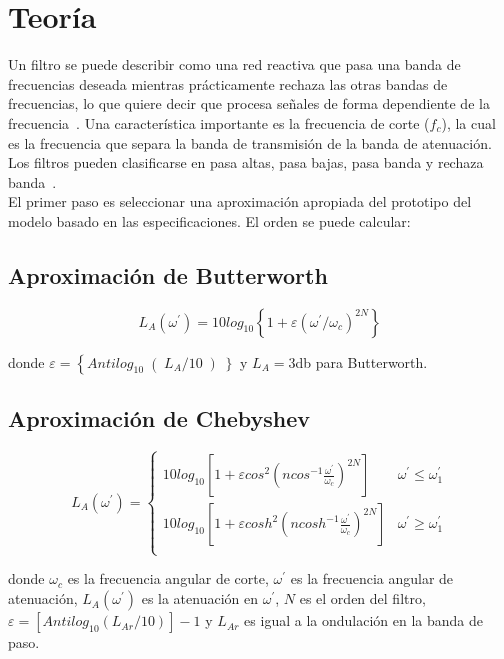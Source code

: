 \section{Teoría}
Un filtro se puede describir como una red reactiva que pasa una banda de frecuencias deseada mientras prácticamente rechaza las otras bandas de frecuencias, lo que quiere decir que procesa señales de forma dependiente de la frecuencia~\cite{zumbahlen2008581}. Una característica importante es la frecuencia de corte ($f_{c}$), la cual es la frecuencia que separa la banda de transmisión de la banda de atenuación. Los filtros pueden clasificarse en pasa altas, pasa bajas, pasa banda y rechaza banda~\cite{keysight_csc2}. \\

El primer paso es seleccionar una aproximación apropiada del prototipo del modelo basado en las especificaciones. El orden se puede calcular:

\subsection*{Aproximación de Butterworth}
\begin{equation}
    L_{A}(\omega^{'}) = 10 log_{10} \left\{1 + \varepsilon \left( \omega^{'} / \omega_{c} \right)^{2N} \right\}
\end{equation}

donde $\varepsilon = \left\{ Antilog_{10} \right( L_{A} / 10 \left) \right\}$ y $L_{A} = 3$db para Butterworth.


\subsection*{Aproximación de Chebyshev}
\begin{equation}
    L_{A}(\omega^{'}) =
    \begin{cases}
        10 log_{10} \left[ 1 + \varepsilon cos^{2} \left( ncos^{-1} \frac{\omega^{'}}{\omega_{c}} \right)^{2N} \right] & \omega^{'} \leq \omega^{'}_{1} \\
        10 log_{10} \left[ 1 + \varepsilon cosh^{2} \left( ncosh^{-1} \frac{\omega^{'}}{\omega_{c}} \right)^{2N} \right] & \omega^{'} \geq \omega^{'}_{1} \\
    \end{cases}
\end{equation}

donde $\omega_{c}$ es la frecuencia angular de corte, $\omega^{'}$ es la frecuencia angular de atenuación, $L_{A}(\omega^{'})$ es la atenuación en $\omega^{'}$, $N$ es el orden del filtro, $\varepsilon = [Antilog_{10} ( L_{Ar} / 10)] - 1$ y $L_{Ar}$ es igual a la ondulación en la banda de paso. \\

